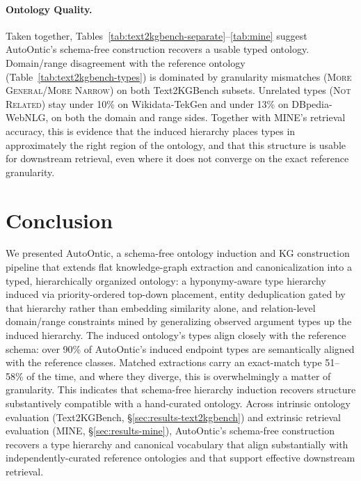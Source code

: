 \documentclass[11pt]{article}
\begin{document}
\paragraph{Ontology Quality.} Taken together, Tables~\ref{tab:text2kgbench-separate}--\ref{tab:mine} suggest AutoOntic's schema-free construction recovers a usable typed ontology. Domain/range disagreement with the reference ontology (Table~\ref{tab:text2kgbench-types}) is dominated by granularity mismatches (\textsc{More General}/\textsc{More Narrow}) on both Text2KGBench subsets. Unrelated types (\textsc{Not Related}) stay under 10\% on Wikidata-TekGen and under 13\% on DBpedia-WebNLG, on both the domain and range sides. Together with MINE's retrieval accuracy, this is evidence that the induced hierarchy places types in approximately the right region of the ontology, and that this structure is usable for downstream retrieval, even where it does not converge on the exact reference granularity.

\section{Conclusion}
We presented AutoOntic, a schema-free ontology induction and KG construction pipeline that extends flat knowledge-graph extraction and canonicalization into a typed, hierarchically organized ontology: a hyponymy-aware type hierarchy induced via priority-ordered top-down placement, entity deduplication gated by that hierarchy rather than embedding similarity alone, and relation-level domain/range constraints mined by generalizing observed argument types up the induced hierarchy. The induced ontology's types align closely with the reference schema: over 90\% of AutoOntic’s induced endpoint types are semantically aligned with the reference classes. Matched extractions carry an exact-match type 51–58\% of the time, and where they diverge, this is overwhelmingly a matter of granularity. This indicates that schema-free hierarchy induction recovers structure substantively compatible with a hand-curated ontology. Across intrinsic ontology evaluation (Text2KGBench, \S\ref{sec:results-text2kgbench}) and extrinsic retrieval evaluation (MINE, \S\ref{sec:results-mine}), AutoOntic's schema-free construction recovers a type hierarchy and canonical vocabulary that align substantially with independently-curated reference ontologies and that support effective downstream retrieval.



\end{document}
